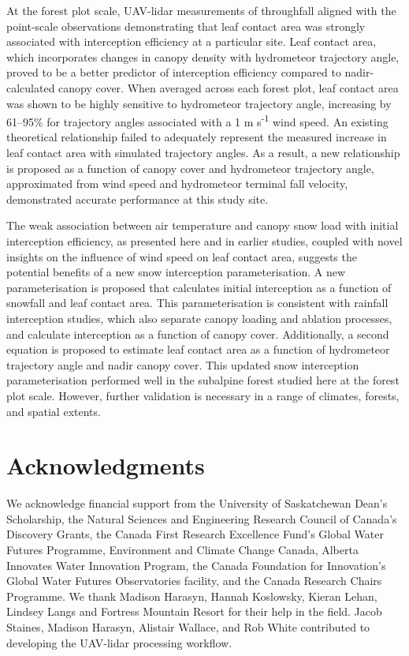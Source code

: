 \documentclass[
  letterpaper,
]{tex/uofsthesis-cs}
\begin{document}
At the forest plot scale, UAV-lidar measurements of throughfall aligned
with the point-scale observations demonstrating that leaf contact area
was strongly associated with interception efficiency at a particular
site. Leaf contact area, which incorporates changes in canopy density
with hydrometeor trajectory angle, proved to be a better predictor of
interception efficiency compared to nadir-calculated canopy cover. When
averaged across each forest plot, leaf contact area was shown to be
highly sensitive to hydrometeor trajectory angle, increasing by 61--95\%
for trajectory angles associated with a 1 m s\textsuperscript{-1} wind
speed. An existing theoretical relationship failed to adequately
represent the measured increase in leaf contact area with simulated
trajectory angles. As a result, a new relationship is proposed as a
function of canopy cover and hydrometeor trajectory angle, approximated
from wind speed and hydrometeor terminal fall velocity, demonstrated
accurate performance at this study site.

The weak association between air temperature and canopy snow load with
initial interception efficiency, as presented here and in earlier
studies, coupled with novel insights on the influence of wind speed on
leaf contact area, suggests the potential benefits of a new snow
interception parameterisation. A new parameterisation is proposed that
calculates initial interception as a function of snowfall and leaf
contact area. This parameterisation is consistent with rainfall
interception studies, which also separate canopy loading and ablation
processes, and calculate interception as a function of canopy cover.
Additionally, a second equation is proposed to estimate leaf contact
area as a function of hydrometeor trajectory angle and nadir canopy
cover. This updated snow interception parameterisation performed well in
the subalpine forest studied here at the forest plot scale. However,
further validation is necessary in a range of climates, forests, and
spatial extents.

\section{Acknowledgments}\label{acknowledgments-1}

We acknowledge financial support from the University of Saskatchewan
Dean's Scholarship, the Natural Sciences and Engineering Research
Council of Canada's Discovery Grants, the Canada First Research
Excellence Fund's Global Water Futures Programme, Environment and
Climate Change Canada, Alberta Innovates Water Innovation Program, the
Canada Foundation for Innovation's Global Water Futures Observatories
facility, and the Canada Research Chairs Programme. We thank Madison
Harasyn, Hannah Koslowsky, Kieran Lehan, Lindsey Langs and Fortress
Mountain Resort for their help in the field. Jacob Staines, Madison
Harasyn, Alistair Wallace, and Rob White contributed to developing the
UAV-lidar processing workflow.
\end{document}
